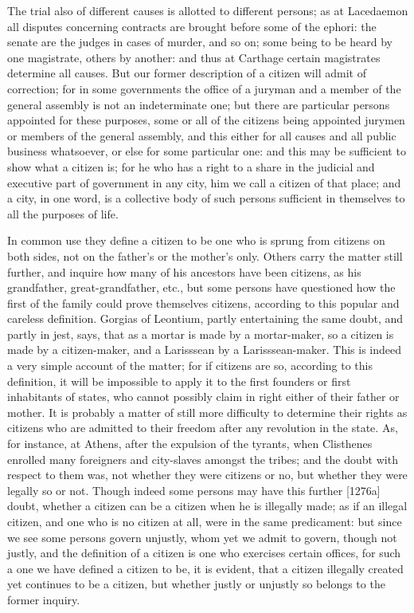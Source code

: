 The trial also of different causes is allotted to different persons; as at
Lacedaemon all disputes concerning contracts are brought before some of
the ephori: the senate are the judges in cases of murder, and so on; some
being to be heard by one magistrate, others by another: and thus at
Carthage certain magistrates determine all causes. But our former
description of a citizen will admit of correction; for in some governments
the office of a juryman and a member of the general assembly is not an
indeterminate one; but there are particular persons appointed for these
purposes, some or all of the citizens being appointed jurymen or members
of the general assembly, and this either for all causes and all public
business whatsoever, or else for some particular one: and this may be
sufficient to show what a citizen is; for he who has a right to a share in
the judicial and executive part of government in any city, him we call a
citizen of that place; and a city, in one word, is a collective body of
such persons sufficient in themselves to all the purposes of life.


In common use they define a citizen to be one who is sprung from citizens
on both sides, not on the father's or the mother's only. Others carry the
matter still further, and inquire how many of his ancestors have been
citizens, as his grandfather, great-grandfather, etc., but some persons
have questioned how the first of the family could prove themselves
citizens, according to this popular and careless definition. Gorgias of
Leontium, partly entertaining the same doubt, and partly in jest, says,
that as a mortar is made by a mortar-maker, so a citizen is made by a
citizen-maker, and a Larisssean by a Larisssean-maker. This is indeed a
very simple account of the matter; for if citizens are so, according to
this definition, it will be impossible to apply it to the first founders
or first inhabitants of states, who cannot possibly claim in right either
of their father or mother. It is probably a matter of still more
difficulty to determine their rights as citizens who are admitted to their
freedom after any revolution in the state. As, for instance, at Athens,
after the expulsion of the tyrants, when Clisthenes enrolled many
foreigners and city-slaves amongst the tribes; and the doubt with respect
to them was, not whether they were citizens or no, but whether they were
legally so or not. Though indeed some persons may have this further
[1276a] doubt, whether a citizen can be a citizen when he is illegally
made; as if an illegal citizen, and one who is no citizen at all, were in
the same predicament: but since we see some persons govern unjustly, whom
yet we admit to govern, though not justly, and the definition of a citizen
is one who exercises certain offices, for such a one we have defined a
citizen to be, it is evident, that a citizen illegally created yet
continues to be a citizen, but whether justly or unjustly so belongs to
the former inquiry.

